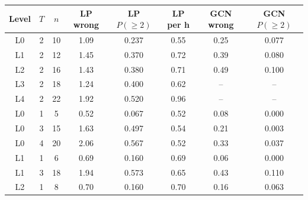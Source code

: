 \begin{tabular}{cccccccc}
\toprule
Level & $T$ & $n$ & LP wrong & LP $P(\geq 2)$ & LP per h & GCN wrong & GCN $P(\geq 2)$ \\
\midrule
L0 & 2 & 10 & 1.09 & 0.237 & 0.55 & 0.25 & 0.077 \\
L1 & 2 & 12 & 1.45 & 0.370 & 0.72 & 0.39 & 0.080 \\
L2 & 2 & 16 & 1.43 & 0.380 & 0.71 & 0.49 & 0.100 \\
L3 & 2 & 18 & 1.24 & 0.400 & 0.62 & -- & -- \\
L4 & 2 & 22 & 1.92 & 0.520 & 0.96 & -- & -- \\
\midrule
L0 & 1 & 5 & 0.52 & 0.067 & 0.52 & 0.08 & 0.000 \\
L0 & 3 & 15 & 1.63 & 0.497 & 0.54 & 0.21 & 0.003 \\
L0 & 4 & 20 & 2.06 & 0.567 & 0.52 & 0.33 & 0.037 \\
L1 & 1 & 6 & 0.69 & 0.160 & 0.69 & 0.06 & 0.000 \\
L1 & 3 & 18 & 1.94 & 0.573 & 0.65 & 0.43 & 0.110 \\
L2 & 1 & 8 & 0.70 & 0.160 & 0.70 & 0.16 & 0.063 \\
\bottomrule
\end{tabular}
